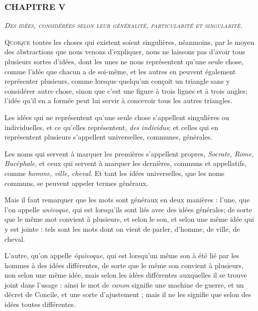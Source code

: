 \subsubsection{\centering \Large CHAPITRE V}
\begin{center}\emph{\large\scshape Des idées, considérées selon leur généralité, particularité et singularité.}\end{center}

	\lettrine{Q}{uoique} toutes les choses qui existent soient singulières, néanmoins, par le moyen des abstractions que nous venons d'expliquer, nous ne laissons pas d'avoir tous plusieurs sortes d'idées, dont les unes ne nous représentent qu'une seule chose, comme l'idée que chacun a de soi-même, et les autres en peuvent également représenter plusieurs, comme lorsque quelqu'un conçoit un triangle sans y considérer autre chose, sinon que c'est une figure à trois lignes et à trois angles; l'idée qu'il en a formée peut lui servir à concevoir tous les autres triangles.

Les idées qui ne représentent qu'une seule chose s'appellent singulières ou individuelles, et ce qu'elles représentent, \emph{des individus}; et celles qui en représentent plusieurs s'appellent universelles, communes, générales.

Les noms qui servent à marquer les premières s'appellent propres, \emph{Socrate, Rome, Bucéphale}, et ceux qui servent à marquer les dernières, communs et appellatifs, comme \emph{homme, ville, cheval}. Et tant les idées universelles, que les noms communs, se peuvent appeler termes généraux.

Mais il faut remarquer que les mots sont généraux en deux manières : l'une, que l'on appelle \emph{univoque}, qui est lorsqu'ils sont liés avec des idées générales; de sorte que le même mot convient à plusieurs, et selon le son, et selon une même idée qui y est jointe : tels sont les mots dont on vient de parler, d'homme, de ville, de cheval.

L'autre, qu'on appelle \emph{équivoque}, qui est lorsqu'un même son à été lié par les hommes à des idées différentes, de sorte que le même son convient à plusieurs, non selon une même idée, mais selon les idées différentes auxquelles il se trouve joint dans l'usage : ainsi le mot de \emph{canon} signifie une machine de guerre, et un décret de Concile, et une sorte d'ajustement ; mais il ne les signifie que selon des idées toutes différentes.

